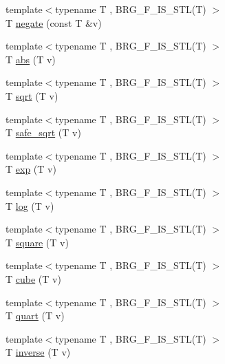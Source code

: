 \begin{DoxyCompactItemize}
\item 
{\footnotesize template$<$typename T , B\-R\-G\-\_\-\-F\-\_\-\-I\-S\-\_\-\-S\-T\-L(\-T) $>$ }\\T \hyperlink{namespaceIceBRG_a03db4c808b800d589c05437ff083f7da}{negate} (const T \&v)
\item 
{\footnotesize template$<$typename T , B\-R\-G\-\_\-\-F\-\_\-\-I\-S\-\_\-\-S\-T\-L(\-T) $>$ }\\T \hyperlink{namespaceIceBRG_a9935318c04d99a09b99e4b87d88ba856}{abs} (T v)
\item 
{\footnotesize template$<$typename T , B\-R\-G\-\_\-\-F\-\_\-\-I\-S\-\_\-\-S\-T\-L(\-T) $>$ }\\T \hyperlink{namespaceIceBRG_a79dbde230197b096e9c185f82de1c4a6}{sqrt} (T v)
\item 
{\footnotesize template$<$typename T , B\-R\-G\-\_\-\-F\-\_\-\-I\-S\-\_\-\-S\-T\-L(\-T) $>$ }\\T \hyperlink{namespaceIceBRG_a29934e2c9bad92a531fb21b4067cd997}{safe\-\_\-sqrt} (T v)
\item 
{\footnotesize template$<$typename T , B\-R\-G\-\_\-\-F\-\_\-\-I\-S\-\_\-\-S\-T\-L(\-T) $>$ }\\T \hyperlink{namespaceIceBRG_aeb3fa61993d04b9be3cff2c32cadab13}{exp} (T v)
\item 
{\footnotesize template$<$typename T , B\-R\-G\-\_\-\-F\-\_\-\-I\-S\-\_\-\-S\-T\-L(\-T) $>$ }\\T \hyperlink{namespaceIceBRG_a7b12afefe78507c9db209418443b3ead}{log} (T v)
\item 
{\footnotesize template$<$typename T , B\-R\-G\-\_\-\-F\-\_\-\-I\-S\-\_\-\-S\-T\-L(\-T) $>$ }\\T \hyperlink{namespaceIceBRG_a97aa4e94a7b6218fcb6f9689e1f6b557}{square} (T v)
\item 
{\footnotesize template$<$typename T , B\-R\-G\-\_\-\-F\-\_\-\-I\-S\-\_\-\-S\-T\-L(\-T) $>$ }\\T \hyperlink{namespaceIceBRG_a2cdc8520f62b9c88cfcd50132fd80ee4}{cube} (T v)
\item 
{\footnotesize template$<$typename T , B\-R\-G\-\_\-\-F\-\_\-\-I\-S\-\_\-\-S\-T\-L(\-T) $>$ }\\T \hyperlink{namespaceIceBRG_af54e101d5c62b8c91bfb607c86335ac8}{quart} (T v)
\item 
{\footnotesize template$<$typename T , B\-R\-G\-\_\-\-F\-\_\-\-I\-S\-\_\-\-S\-T\-L(\-T) $>$ }\\T \hyperlink{namespaceIceBRG_ab6a58902bc117f9f8bf7ba9f8211a4bb}{inverse} (T v)

\end{DoxyCompactItemize}
